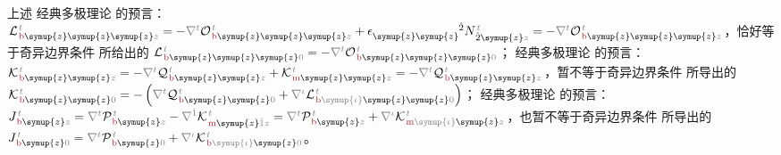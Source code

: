 上述 {\one} 经典多极理论  的预言：${\mathcal{L}}^{\;\!\mathcolor{gray}{t}}_{\;\!\textcolor{Maroon}{\text{b}} \symup{z} \symup{z} \symup{z} \mathcolor{gray}{z}} = - \mathcolor{gray}{\nabla^t} {\mathcal{O}}^{\;\!\mathcolor{gray}{t}}_{\;\!\textcolor{Maroon}{\text{b}} \symup{z} \symup{z} \symup{z} \mathcolor{gray}{z}} + \epsilon^{\hphantom{\symup{z} \symup{z}}\hat{2}}_{\symup{z} \symup{z}} N^{\;\!\mathcolor{gray}{t}}_{\;\! \hat{2}\symup{z}\mathcolor{gray}{z}} = - \mathcolor{gray}{\nabla^t} {\mathcal{O}}^{\;\!\mathcolor{gray}{t}}_{\;\!\textcolor{Maroon}{\text{b}} \symup{z} \symup{z} \symup{z} \mathcolor{gray}{z}}$，恰好等于奇异边界条件  所给出的 ${\mathcal{L}}^{\;\!\mathcolor{gray}{t}}_{\;\!\textcolor{Maroon}{\text{b}} \symup{z} \symup{z} \symup{z} \mathcolor{gray}{0}} = - \mathcolor{gray}{\nabla^t} {\mathcal{O}}^{\;\!\mathcolor{gray}{t}}_{\;\!\textcolor{Maroon}{\text{b}} \symup{z} \symup{z} \symup{z} \mathcolor{gray}{0}}$；{\two} 经典多极理论  的预言：${\mathcal{K}}^{\;\!\mathcolor{gray}{t}}_{\;\!\textcolor{Maroon}{\text{b}} \symup{z} \symup{z} \mathcolor{gray}{z}} = - \mathcolor{gray}{\nabla^t} {\mathcal{Q}}^{\;\!\mathcolor{gray}{t}}_{\;\!\textcolor{Maroon}{\text{b}} \symup{z} \symup{z} \mathcolor{gray}{z}} + {\mathcal{K}}^{\;\!\mathcolor{gray}{t}}_{\;\!\textcolor{Maroon}{\text{m}} \symup{z} \symup{z} \mathcolor{gray}{z}} = - \mathcolor{gray}{\nabla^t} {\mathcal{Q}}^{\;\!\mathcolor{gray}{t}}_{\;\!\textcolor{Maroon}{\text{b}} \symup{z} \symup{z} \mathcolor{gray}{z}}$，暂不等于奇异边界条件  所导出的 ${\mathcal{K}}^{\;\!\mathcolor{gray}{t}}_{\;\!\textcolor{Maroon}{\text{b}} \symup{z} \symup{z} \mathcolor{gray}{0}} = - \left( \mathcolor{gray}{\nabla^t} {\mathcal{Q}}^{\;\!\mathcolor{gray}{t}}_{\;\!\textcolor{Maroon}{\text{b}} \symup{z} \symup{z} \mathcolor{gray}{0}} + \mathcolor{gray}{\nabla^\iota} {\mathcal{L}}^{\;\!\mathcolor{gray}{t}}_{\;\!\textcolor{Maroon}{\text{b}} \mathcolor{gray}{\symup{\iota}} \symup{z} \symup{z} \mathcolor{gray}{0}} \right)$；{\three} 经典多极理论  的预言：${J}^{\;\!\mathcolor{gray}{t}}_{\;\!\textcolor{Maroon}{\text{b}} \symup{z} \mathcolor{gray}{z}} = \mathcolor{gray}{\nabla^t} {\mathcal{P}}^{\;\!\mathcolor{gray}{t}}_{\;\!\textcolor{Maroon}{\text{b}} \symup{z} \mathcolor{gray}{z}} - \mathcolor{gray}{\nabla^{\hat{1}}} {\mathcal{K}}^{\;\!\mathcolor{gray}{t}}_{\;\!\textcolor{Maroon}{\text{m}} \symup{z} \mathcolor{gray}{\hat{1}} \mathcolor{gray}{z}} = \mathcolor{gray}{\nabla^t} {\mathcal{P}}^{\;\!\mathcolor{gray}{t}}_{\;\!\textcolor{Maroon}{\text{b}} \symup{z} \mathcolor{gray}{z}} + \mathcolor{gray}{\nabla^\iota} {\mathcal{K}}^{\;\!\mathcolor{gray}{t}}_{\;\!\textcolor{Maroon}{\text{m}} \mathcolor{gray}{\symup{\iota}} \symup{z} \mathcolor{gray}{z}}$，也暂不等于奇异边界条件  所导出的 ${J}^{\;\!\mathcolor{gray}{t}}_{\;\!\textcolor{Maroon}{\text{b}} \symup{z} \mathcolor{gray}{0}} = \mathcolor{gray}{\nabla^t} {\mathcal{P}}^{\;\!\mathcolor{gray}{t}}_{\;\!\textcolor{Maroon}{\text{b}} \symup{z} \mathcolor{gray}{0}} + \mathcolor{gray}{\nabla^\iota} {\mathcal{K}}^{\;\!\mathcolor{gray}{t}}_{\;\!\textcolor{Maroon}{\text{b}} \mathcolor{gray}{\symup{\iota}} \symup{z}\mathcolor{gray}{0}}$。

